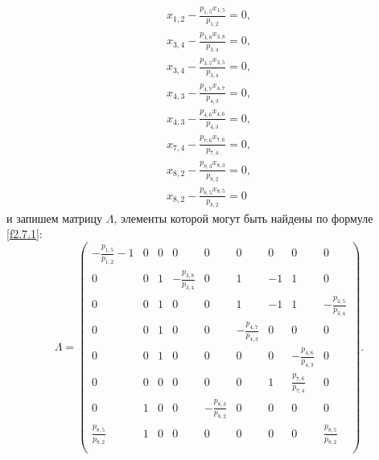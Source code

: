 \documentclass[14pt]{extarticle}%
\begin{document}
\begin{equation}\label{f3.1.23}
\begin{gathered}
x_{1,2}-\frac{p_{1,5} x_{1,5}}{p_{1,2}}=0,\\
x_{3,4}-\frac{p_{3,8} x_{3,8}}{p_{3,4}}=0,\\
x_{3,4}-\frac{p_{3,5} x_{3,5}}{p_{3,4}}=0,\\
x_{4,3}-\frac{p_{4,7} x_{4,7}}{p_{4,3}}=0,\\
x_{4,3}-\frac{p_{4,6} x_{4,6}}{p_{4,3}}=0,\\
x_{7,4}-\frac{p_{7,6} x_{7,6}}{p_{7,4}}=0,\\
x_{8,2}-\frac{p_{8,3} x_{8,3}}{p_{8,2}}=0,\\
x_{8,2}-\frac{p_{8,5} x_{8,5}}{p_{8,2}}=0
\end{gathered}
\end{equation}
и запишем матрицу $\Lambda$, элементы которой могут быть найдены по формуле \eqref{f2.7.1}:
$$
\Lambda=\left(
\begin{array}{ccccccccc}
 -\frac{p_{1,5}}{p_{1,2}}-1 & 0 & 0 & 0 & 0 & 0 & 0 & 0 & 0 \\
 0 & 0 & 1 & -\frac{p_{3,8}}{p_{3,4}} & 0 & 1 & -1 & 1 & 0 \\
 0 & 0 & 1 & 0 & 0 & 1 & -1 & 1 & -\frac{p_{3,5}}{p_{3,4}} \\
 0 & 0 & 1 & 0 & 0 & -\frac{p_{4,7}}{p_{4,3}} & 0 & 0 & 0 \\
 0 & 0 & 1 & 0 & 0 & 0 & 0 & -\frac{p_{4,6}}{p_{4,3}} & 0 \\
 0 & 0 & 0 & 0 & 0 & 0 & 1 & \frac{p_{7,6}}{p_{7,4}} & 0 \\
 0 & 1 & 0 & 0 & -\frac{p_{8,3}}{p_{8,2}} & 0 & 0 & 0 & 0 \\
 \frac{p_{8,5}}{p_{8,2}} & 1 & 0 & 0 & 0 & 0 & 0 & 0 & \frac{p_{8,5}}{p_{8,2}} \\
\end{array}
\right).
$$
\end{document}
